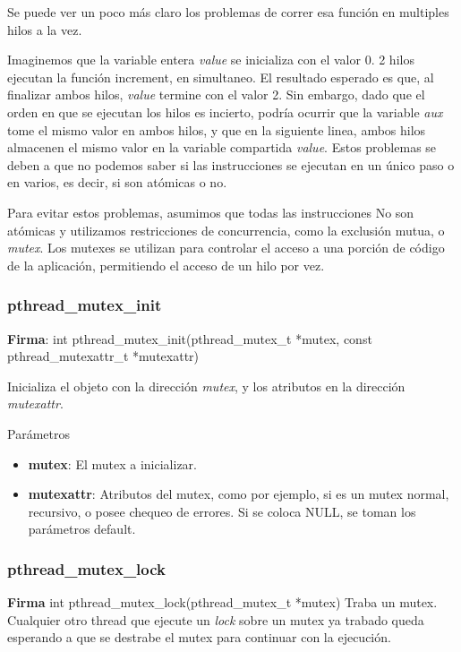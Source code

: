 \documentclass[a4paper, twoside]{article}
\begin{document}
Se puede ver un poco más claro los problemas de correr esa función en multiples hilos a la vez.

Imaginemos que la variable entera \emph{value} se inicializa con el valor 0. 2 hilos ejecutan la función increment, en simultaneo. El resultado esperado es que, al finalizar ambos hilos, \emph{value} termine con el valor 2.
Sin embargo, dado que el orden en que se ejecutan los hilos es incierto, podría ocurrir que la variable \emph{aux} tome el mismo valor en ambos hilos, y que en la siguiente linea, ambos hilos almacenen el mismo valor en la variable compartida \emph{value}. Estos problemas se deben a que no podemos saber si las instrucciones se ejecutan en un único paso o en varios, es decir, si son atómicas o no.

Para evitar estos problemas, asumimos que todas las instrucciones No son atómicas y utilizamos restricciones de concurrencia, como la exclusión mutua, o \emph{mutex}. Los mutexes se utilizan para controlar el acceso a una porción de código de la aplicación, permitiendo el acceso de un hilo por vez.

\subsubsection{pthread\_mutex\_init}
\textbf{Firma}: int pthread\_mutex\_init(pthread\_mutex\_t *mutex, const pthread\_mutexattr\_t *mutexattr)\par
Inicializa el objeto con la dirección \emph{mutex}, y los atributos en la dirección \emph{mutexattr}.

\begin{parametros*}{Parámetros}
	\begin{itemize}
		\item \textbf{mutex}: El mutex a inicializar.
		\item \textbf{mutexattr}: Atributos del mutex, como por ejemplo, si es un mutex normal, recursivo, o posee chequeo de errores. Si se coloca NULL, se toman los parámetros default.
	\end{itemize}
\end{parametros*}

\subsubsection{pthread\_mutex\_lock}
\textbf{Firma} int pthread\_mutex\_lock(pthread\_mutex\_t *mutex)
Traba un mutex. Cualquier otro thread que ejecute un \emph{lock} sobre un mutex ya trabado queda esperando a que se destrabe el mutex para continuar con la ejecución.
\end{document}
